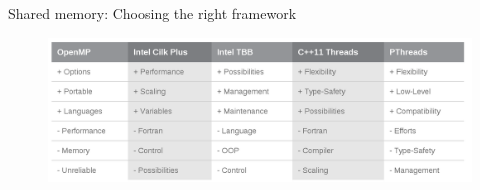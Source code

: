\documentclass[10pt,times]{beamer}
\begin{document}
\begin{frame}{Shared memory: Choosing the right framework}

\begin{figure}
\includegraphics[width=\linewidth]{figs/shared_memory_comparison.png}
\end{figure}
\end{frame}
\end{document}
